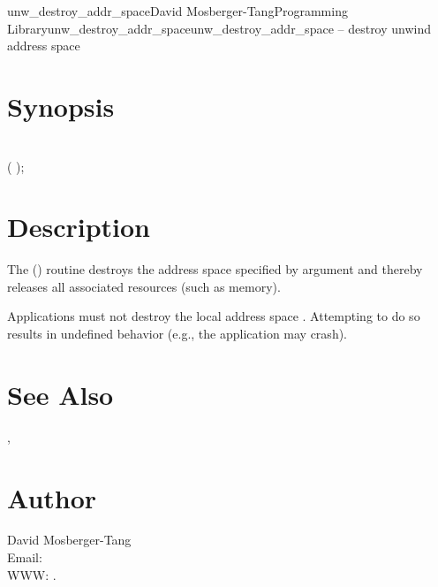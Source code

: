 \documentclass{article}
\begin{document}
\begin{Name}{3}{unw\_destroy\_addr\_space}{David Mosberger-Tang}{Programming Library}{unw\_destroy\_addr\_space}unw\_destroy\_addr\_space -- destroy unwind address space
\end{Name}

\section{Synopsis}

\\

 ( );\\

\section{Description}

The () routine destroys the
address space specified by argument  and thereby releases
all associated resources (such as memory).

Applications must not destroy the local address space
.  Attempting to do so results in
undefined behavior (e.g., the application may crash).

\section{See Also}

,

\section{Author}

\noindent
David Mosberger-Tang\\
Email: \\
WWW: .
\LatexManEnd
\end{document}

